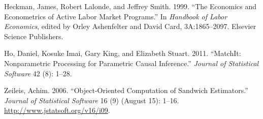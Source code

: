 \documentclass[]{article}
\begin{document}
Heckman, James, Robert Lalonde, and Jeffrey Smith. 1999. ``The Economics
and Econometrics of Active Labor Market Programs.'' In \emph{Handbook of
Labor Economics}, edited by Orley Ashenfelter and David Card,
3A:1865--2097. Elsevier Science Publishers.

Ho, Daniel, Kosuke Imai, Gary King, and Elizabeth Stuart. 2011.
``MatchIt: Nonparametric Processing for Parametric Causal Inference.''
\emph{Journal of Statistical Software} 42 (8): 1--28.

Zeileis, Achim. 2006. ``Object-Oriented Computation of Sandwich
Estimators.'' \emph{Journal of Statistical Software} 16 (9) (August 15):
1--16. \url{http://www.jstatsoft.org/v16/i09}.
\end{document}
